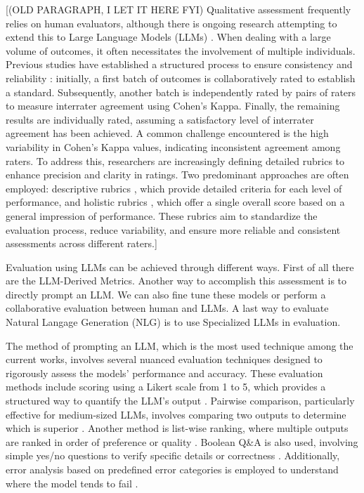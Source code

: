 \documentclass[preprint,12pt]{elsarticle}
\begin{document}
[(OLD PARAGRAPH, I LET IT HERE FYI) Qualitative assessment frequently relies on human evaluators, although there is ongoing research attempting to extend this to Large Language Models (LLMs) \cite{Song2024}. When dealing with a large volume of outcomes, it often necessitates the involvement of multiple individuals. Previous studies have established a structured process to ensure consistency and reliability \cite{Naismith2023} : initially, a first batch of outcomes is collaboratively rated to establish a standard. Subsequently, another batch is independently rated by pairs of raters to measure interrater agreement using Cohen's Kappa. Finally, the remaining results are individually rated, assuming a satisfactory level of interrater agreement has been achieved. A common challenge encountered is the high variability in Cohen's Kappa values, indicating inconsistent agreement among raters. To address this, researchers are increasingly defining detailed rubrics to enhance precision and clarity in ratings. Two predominant approaches are often employed: descriptive rubrics \cite{Moore2023}, which provide detailed criteria for each level of performance, and holistic rubrics \cite{Naismith2023}, which offer a single overall score based on a general impression of performance. These rubrics aim to standardize the evaluation process, reduce variability, and ensure more reliable and consistent assessments across different raters.]

Evaluation using LLMs can be achieved through different ways. First of all there are the LLM-Derived Metrics. Another way to accomplish this assessment is to directly prompt an LLM. We can also fine tune these models or perform a collaborative evaluation between human and LLMs. A last way to evaluate Natural Langage Generation (NLG) is to use Specialized LLMs in evaluation.

The method of prompting an LLM, which is the most used technique among the current works,  involves several nuanced evaluation techniques designed to rigorously assess the models' performance and accuracy. These evaluation methods include scoring using a Likert scale from 1 to 5, which provides a structured way to quantify the LLM's output \cite{Gao2024}. Pairwise comparison, particularly effective for medium-sized LLMs, involves comparing two outputs to determine which is superior \cite{Gao2024}. Another method is list-wise ranking, where multiple outputs are ranked in order of preference or quality \cite{Gao2024}. Boolean Q&A is also used, involving simple yes/no questions to verify specific details or correctness \cite{Gao2024}. Additionally, error analysis based on predefined error categories is employed to understand where the model tends to fail \cite{Gao2024}.
\end{document}

